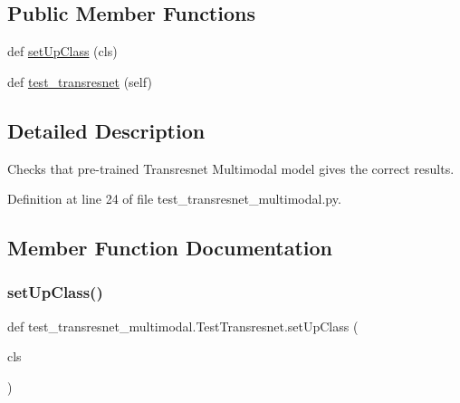\subsection*{Public Member Functions}
\begin{DoxyCompactItemize}
\item 
def \hyperlink{classtest__transresnet__multimodal_1_1TestTransresnet_ac013f711d027118f9d5db92c63659a80}{set\+Up\+Class} (cls)
\item 
def \hyperlink{classtest__transresnet__multimodal_1_1TestTransresnet_a812e5b711af8dfc4edd18dd4862928d5}{test\+\_\+transresnet} (self)
\end{DoxyCompactItemize}


\subsection{Detailed Description}
\begin{DoxyVerb}Checks that pre-trained Transresnet Multimodal model gives the correct results.
\end{DoxyVerb}
 

Definition at line 24 of file test\+\_\+transresnet\+\_\+multimodal.\+py.



\subsection{Member Function Documentation}
\mbox{\label{classtest__transresnet__multimodal_1_1TestTransresnet_ac013f711d027118f9d5db92c63659a80}} 
\subsubsection{\texorpdfstring{set\+Up\+Class()}{setUpClass()}}
{\footnotesize\ttfamily def test\+\_\+transresnet\+\_\+multimodal.\+Test\+Transresnet.\+set\+Up\+Class (\begin{DoxyParamCaption}\item[{}]{cls }\end{DoxyParamCaption})}

